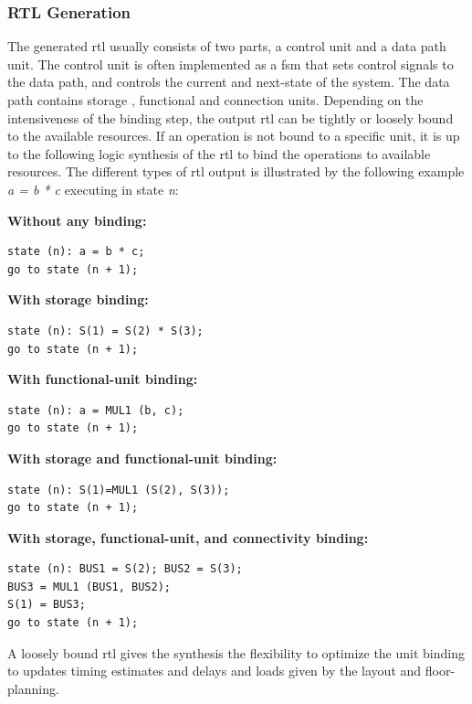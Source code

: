 \subsubsection{RTL Generation}
The generated \gls{rtl} usually consists of two parts, a control unit and a data path unit. The control unit is often implemented as a \gls{fsm} that sets control signals to the data path, and controls the current and next-state of the system. The data path contains storage , functional and connection units. Depending on the intensiveness of the binding step, the output \gls{rtl} can be tightly or loosely bound to the available resources. If an operation is not bound to a specific unit, it is up to the following logic synthesis of the \gls{rtl} to bind the operations to available resources. The different types of \gls{rtl} output is illustrated by the following example \textit{a = b * c} executing in state \textit{n}:\\
\begin{minipage}[t][300px]{\textwidth}
\textbf{Without any binding:}%
\begin{verbatim}
state (n): a = b * c;
go to state (n + 1);
\end{verbatim}
\textbf{With storage binding:}%
\begin{verbatim}
state (n): S(1) = S(2) * S(3);
go to state (n + 1);
\end{verbatim}
\textbf{With functional-unit binding:}%
\begin{verbatim}
state (n): a = MUL1 (b, c);
go to state (n + 1);
\end{verbatim}
\textbf{With storage and functional-unit binding:}%
\begin{verbatim}
state (n): S(1)=MUL1 (S(2), S(3));
go to state (n + 1);
\end{verbatim}
\textbf{With storage, functional-unit, and connectivity binding:}%
\begin{verbatim}
state (n): BUS1 = S(2); BUS2 = S(3);
BUS3 = MUL1 (BUS1, BUS2);
S(1) = BUS3;
go to state (n + 1);
\end{verbatim}
\end{minipage}
A loosely bound \gls{rtl} gives the synthesis the flexibility to optimize the unit binding to updates timing estimates and delays and loads given by the layout and floor-planning.
